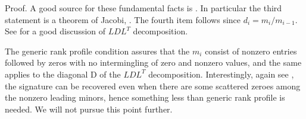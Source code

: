 \documentclass{acm_proc_article-sp}
\begin{document}
Proof.  A good source for these fundamental facts is \cite{gantmacher}.
In particular the third statement is a theorem of Jacobi, \cite[Chapter X, \S 3, theorem 2]{gantmacher}.
The fourth item follows since $d_i = m_i/m_{i-1}$.
See \cite[Chapter 4]{GoLo96} for a good discussion of $LDL^T$ decomposition.
\QED

The generic rank profile condition assures that the $m_i$ consist of nonzero entries followed
by zeros with no intermingling of zero and nonzero values, and the same applies to the 
diagonal D of the $LDL^T$ decomposition.
Interestingly, again see \cite{gantmacher}, the 
signature can be recovered even when there are some scattered zeroes among the nonzero 
leading minors, hence something less than generic rank profile is needed.  We will not
pursue this point further. 

\end{document}
